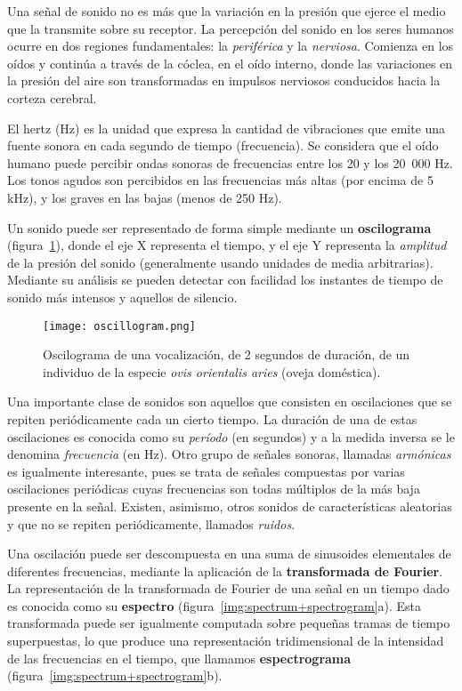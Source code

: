 Una señal de sonido no es más que la variación en la presión que ejerce el medio que la transmite sobre su receptor.
La percepción del sonido en los seres humanos ocurre en dos regiones fundamentales: la \textit{periférica} y la \textit{nerviosa}.
Comienza en los oídos y continúa a través de la cóclea, en el oído interno, donde las variaciones en la presión del aire son transformadas en impulsos nerviosos conducidos hacia la corteza cerebral.

El hertz (Hz) es la unidad que expresa la cantidad de vibraciones que emite una fuente sonora en cada segundo de tiempo (frecuencia).
Se considera que el oído humano puede percibir ondas sonoras de frecuencias entre los 20 y los 20~000 Hz.
Los tonos agudos son percibidos en las frecuencias más altas (por encima de 5 kHz), y los graves en las bajas (menos de 250 Hz).

Un sonido puede ser representado de forma simple mediante un \textbf{oscilograma} (figura~\ref{img:oscillogram}), donde el eje X representa el tiempo, y el eje Y representa la \textit{amplitud} de la presión del sonido (generalmente usando unidades de media arbitrarias).
Mediante su análisis se pueden detectar con facilidad los instantes de tiempo de sonido más intensos y aquellos de silencio.

\begin{figure}[!h]
    \centering
    \texttt{[image: oscillogram.png]}
    \caption{Oscilograma de una vocalización, de 2 segundos de duración, de un individuo de la especie \textit{ovis orientalis aries} (oveja doméstica).}
    \label{img:oscillogram}
\end{figure}

Una importante clase de sonidos son aquellos que consisten en oscilaciones que se repiten periódicamente cada un cierto tiempo.
La duración de una de estas oscilaciones es conocida como su \textit{período} (en segundos) y a la medida inversa se le denomina \textit{frecuencia} (en Hz).
Otro grupo de señales sonoras, llamadas \textit{armónicas} es igualmente interesante, pues se trata de señales compuestas por varias oscilaciones periódicas cuyas frecuencias son todas múltiplos de la más baja presente en la señal.
Existen, asimismo, otros sonidos de características aleatorias y que no se repiten periódicamente, llamados \textit{ruidos}.

Una oscilación puede ser descompuesta en una suma de sinusoides elementales de diferentes frecuencias, mediante la aplicación de la \textbf{transformada de Fourier}.
La representación de la transformada de Fourier de una señal en un tiempo dado es conocida como su \textbf{espectro} (figura~\ref{img:spectrum+spectrogram}a).
Esta transformada puede ser igualmente computada sobre pequeñas tramas de tiempo superpuestas, lo que produce una representación tridimensional de la intensidad de las frecuencias en el tiempo, que llamamos \textbf{espectrograma} (figura~\ref{img:spectrum+spectrogram}b).

